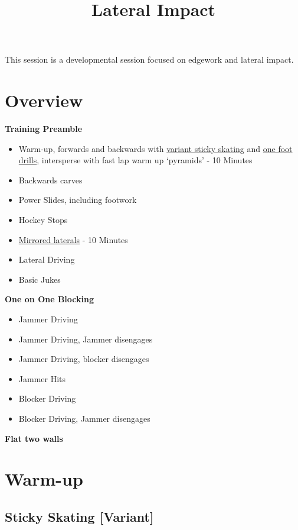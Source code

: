 \documentclass{journal}
\title{Lateral Impact}
\author{}
\begin{document}
\maketitle
\noindent 


This session is a developmental session focused on edgework and lateral impact.  


\section*{Overview}

{\bf Training Preamble}
\begin{itemize}
\item Warm-up, forwards and backwards with \hyperref[drill:sticky:sticky_one_foot]{variant sticky skating} and \hyperref[drill:one_foot:serpentine]{one foot drills}, intersperse with fast lap warm up `pyramids' - 10 Minutes
\item Backwards carves
\item Power Slides, including footwork
\item Hockey Stops
\item \hyperref[drill:laterals:mirrored]{Mirrored laterals} - 10 Minutes 
\item Lateral Driving  
\item Basic Jukes 
\end{itemize}

\vspace{1cm}

{\bf One on One Blocking}
\begin{itemize}
\item Jammer Driving
\item Jammer Driving, Jammer disengages 
\item Jammer Driving, blocker disengages
\item Jammer Hits
\item Blocker Driving
\item Blocker Driving, Jammer disengages
\end{itemize}


\vspace{1cm}
\noindent 
{\bf Flat two walls}


\pagebreak
\section*{Warm-up}
\label{sec:warmup}

\subsection*{Sticky Skating [Variant]}
\label{drill:sticky:sticky_one_foot}
\end{document}
